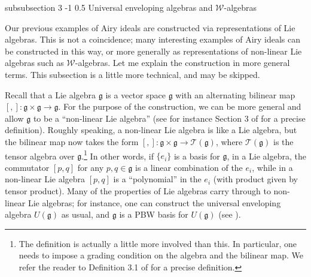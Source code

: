 \documentclass[reqno,oneside,11pt]{amsart}
\makeatletter
\theoremstyle{plain}
\theoremstyle{definition}
\theoremstyle{remark}
\numberwithin{equation}{section}
\renewcommand{\subsubsection}{\@startsection
{subsubsection}%
{3}%
{\z@}%
{-1\baselineskip}%
{0.5\baselineskip}%
{\normalfont \it \normalsize}} %
\makeatother
\begin{document}
\subsubsection{Universal enveloping algebras and $\mathcal{W}$-algebras}
\label{s:uea}

Our previous examples of Airy ideals are constructed via representations of Lie algebras. This is not a coincidence; many interesting examples of Airy ideals can be constructed in this way, or more generally as representations of non-linear Lie algebras such as $\mathcal{W}$-algebras. Let me explain the construction in more general terms. This subsection is a little more technical, and may be skipped.

Recall that a Lie algebra $\mathfrak{g}$ is a vector space $\mathfrak{g}$ with an alternating bilinear map $[,]: \mathfrak{g} \times \mathfrak{g} \to \mathfrak{g}$. For the purpose of the construction, we can be more general and allow $\mathfrak{g}$ to be a ``non-linear Lie algebra'' (see for instance Section 3 of \cite{DK05} for a precise definition). Roughly speaking, a non-linear Lie algebra is like a Lie algebra, but the bilinear map now takes the form $[,]: \mathfrak{g} \times \mathfrak{g} \to \mathcal{T}(\mathfrak{g})$, where $\mathcal{T}(\mathfrak{g})$ is the tensor algebra over $\mathfrak{g}$.\footnote{The definition is actually a little more involved than this. In particular, one needs to impose a grading condition on the algebra and the bilinear map. We refer the reader to Definition 3.1 of \cite{DK05} for a precise definition.} In other words, if $\{ e_i \}$ is a basis for $\mathfrak{g}$, in a Lie algebra, the commutator $[p,q]$ for any $p,q \in \mathfrak{g}$ is a linear combination of the $e_i$, while in a non-linear Lie algebra $[p,q]$ is a ``polynomial'' in the $e_i$ (with product given by tensor product). Many of the properties of Lie algebras carry through to non-linear Lie algebras; for instance, one can construct the universal enveloping algebra $U(\mathfrak{g})$ as usual, and $\mathfrak{g}$ is a PBW basis for $U(\mathfrak{g})$ (see \cite{DK05}). 
\end{document}

